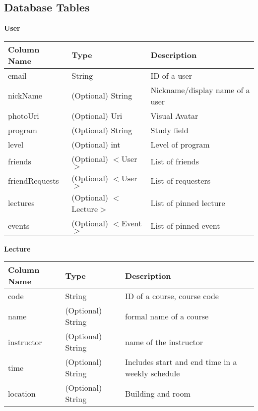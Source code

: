 \documentclass[12pt, titlepage]{article}
\begin{document}
\subsection{Database Tables}

\quad \textbf{User}
\begin{table}[H]
	\begin{tabular}{|p{}|p{}|p{}|}
		\hline
		\textbf{Column Name} & \textbf{Type}  & \textbf{Description}                  \\
		\hline
		email                   & String                & ID of a user                        \\
		\hline
		nickName           & (Optional) String                & Nickname/display name of a user      \\
		\hline
		photoUri           & (Optional) Uri                & Visual Avatar       \\
		\hline
		program            & (Optional) String                & Study field                \\
		\hline
		level             & (Optional) int                & Level of program                 \\
		\hline
		friends          &  (Optional) $<$User$>$                & List of friends \\
		\hline
		friendRequests          &  (Optional) $<$User$>$                & List of requesters              \\
		\hline
		lectures                & (Optional) $<$Lecture$>$                & List of pinned lecture                     \\
		\hline
		events                & (Optional) $<$Event$>$                & List of pinned event                     \\			
		\hline
\end{tabular}
\end{table}

\textbf{Lecture}
\begin{table}[H]
	\begin{tabular}{|p{}|p{}|p{}|}
		\hline
		\textbf{Column Name} & \textbf{Type}  & \textbf{Description}                  \\
		\hline
		code                   & String                & ID of a course, course code\\
		\hline
		name           & (Optional) String     & formal name of a course      \\
		\hline
		instructor           & (Optional) String      & name of the instructor       \\
		\hline
		time            & (Optional) String                & Includes start and end time in a weekly schedule  \\
		\hline
		location             & (Optional) String                & Building and room                 \\
		\hline
\end{tabular}
\end{table}
\end{document}
